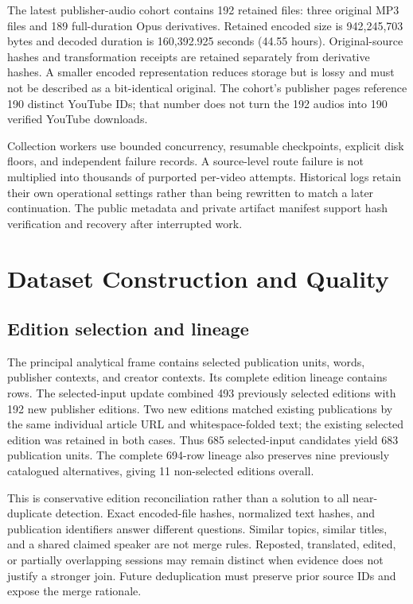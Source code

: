 The latest publisher-audio cohort contains 192 retained files: three original MP3 files and 189 full-duration Opus derivatives. Retained encoded size is 942,245,703 bytes and decoded duration is 160,392.925 seconds (44.55 hours). Original-source hashes and transformation receipts are retained separately from derivative hashes. A smaller encoded representation reduces storage but is lossy and must not be described as a bit-identical original. The cohort's publisher pages reference 190 distinct YouTube IDs; that number does not turn the 192 audios into 190 verified YouTube downloads.

Collection workers use bounded concurrency, resumable checkpoints, explicit disk floors, and independent failure records. A source-level route failure is not multiplied into thousands of purported per-video attempts. Historical logs retain their own operational settings rather than being rewritten to match a later continuation. The public metadata and private artifact manifest support hash verification and recovery after interrupted work.

\section{Dataset Construction and Quality}
\subsection{Edition selection and lineage}
The principal analytical frame contains \SourceCount{} selected publication units, \WordCount{} words, \ContextCount{} publisher contexts, and \CreatorCount{} creator contexts. Its complete edition lineage contains \EditionCount{} rows. The selected-input update combined 493 previously selected editions with 192 new publisher editions. Two new editions matched existing publications by the same individual article URL and whitespace-folded text; the existing selected edition was retained in both cases. Thus 685 selected-input candidates yield 683 publication units. The complete 694-row lineage also preserves nine previously catalogued alternatives, giving 11 non-selected editions overall.

This is conservative edition reconciliation rather than a solution to all near-duplicate detection. Exact encoded-file hashes, normalized text hashes, and publication identifiers answer different questions. Similar topics, similar titles, and a shared claimed speaker are not merge rules. Reposted, translated, edited, or partially overlapping sessions may remain distinct when evidence does not justify a stronger join. Future deduplication must preserve prior source IDs and expose the merge rationale.


